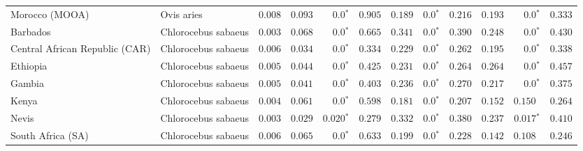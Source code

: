 \documentclass[11pt]{article}
\begin{document}
\begin{table*}[tb]
\begin{tabular}{||l|l|r||r|r|r||r|r|r||r|r|r||}
            Morocco (MOOA)                                      & Ovis aries          & $ 0.008$ & $ 0.093$ & $\bm{0.0{^*}}$    & $ 0.905$ & $ 0.189$ & $\bm{0.0{^*}}$ & $ 0.216$ & $ 0.193$ & $\bm{0.0{^*}}$ & $ 0.333$ \\
            \rowcolor{LIGHTGREY} Barbados                       & Chlorocebus sabaeus & $ 0.003$ & $ 0.068$ & $\bm{0.0{^*}}$                  & $ 0.665$                                                                     & $ 0.341$                      & $\bm{0.0{^*}}$ & $ 0.390$ & $ 0.248$ & $\bm{0.0{^*}}$ & $ 0.430$ \\
            \rowcolor{LIGHTGREY} Central African Republic (CAR) & Chlorocebus sabaeus & $ 0.006$           & $ 0.034$                      & $\bm{0.0{^*}}$ & $ 0.334$ & $ 0.229$ & $\bm{0.0{^*}}$ & $ 0.262$ & $ 0.195$ & $\bm{0.0{^*}}$ & $ 0.338$ \\
            \rowcolor{LIGHTGREY} Ethiopia                       & Chlorocebus sabaeus & $ 0.005$ & $ 0.044$ & $\bm{0.0{^*}}$                  & $ 0.425$                                                                     & $ 0.231$                      & $\bm{0.0{^*}}$ & $ 0.264$ & $ 0.264$ & $\bm{0.0{^*}}$ & $ 0.457$ \\
            \rowcolor{LIGHTGREY} Gambia                         & Chlorocebus sabaeus & $ 0.005$ & $ 0.041$ & $\bm{0.0{^*}}$                  & $ 0.403$                                                                     & $ 0.236$                      & $\bm{0.0{^*}}$ & $ 0.270$ & $ 0.217$ & $\bm{0.0{^*}}$ & $ 0.375$ \\
            \rowcolor{LIGHTGREY} Kenya                          & Chlorocebus sabaeus & $ 0.004$ & $ 0.061$ & $\bm{0.0{^*}}$    & $ 0.598$                                                                     & $ 0.181$                      & $\bm{0.0{^*}}$ & $ 0.207$ & $ 0.152$ & $ 0.150~~$ & $ 0.264$ \\
            \rowcolor{LIGHTGREY} Nevis                          & Chlorocebus sabaeus & $ 0.003$ & $ 0.029$ & $\bm{ 0.020{^*}}$               & $ 0.279$                                                                     & $ 0.332$                      & $\bm{0.0{^*}}$ & $ 0.380$ & $ 0.237$ & $\bm{ 0.017{^*}}$ & $ 0.410$ \\
            \rowcolor{LIGHTGREY} South Africa (SA)              & Chlorocebus sabaeus & $ 0.006$ & $ 0.065$ & $\bm{0.0{^*}}$                  & $ 0.633$                                                                     & $ 0.199$ & $\bm{0.0{^*}}$ & $ 0.228$ & $ 0.142$ & $ 0.108~~$ & $ 0.246$ \\

\end{tabular}
\end{table*}
\end{document}
